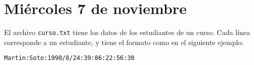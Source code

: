 \documentclass[12pt,spanish]{article}
\begin{document}
  \thispagestyle{empty}
  \section*{Miércoles 7 de noviembre}

  El archivo \texttt{curso.txt} tiene los datos de los estudiantes de un curso.
  Cada línea corresponde a un estudiante,
  y tiene el formato como en el siguiente ejemplo:
  \begin{lstlisting}
Martin:Soto:1990/8/24:39:86:22:56:30
  \end{lstlisting}
\end{document}
